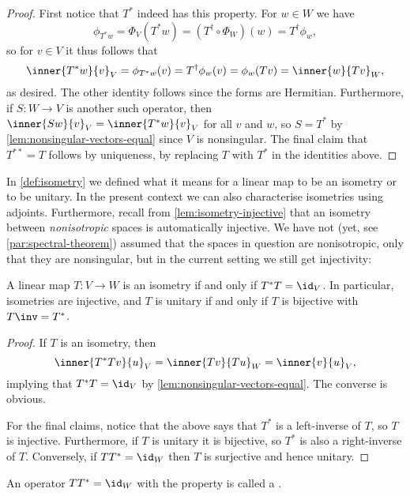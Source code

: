 \documentclass[a4paper, 11pt]{memoir}
\theoremstyle{plaincustomnumber}
\theoremstyle{changedotbreakcustomnumber}
\newcommand{\keyword}[1]{\ifbool{indefinition}{{\itshape #1}}{{\itshape\bfseries #1}}}
\begin{document}
\begin{proof}
    First notice that $T^*$ indeed has this property. For $w \in W$ we have
    \begin{equation*}
        \phi_{T^* w}
            = \Phi_V (T^* w)
            = (T^\dagger \circ \Phi_W)(w)
            = T^\dagger \phi_w,
    \end{equation*}
    so for $v \in V$ it thus follows that
    \begin{equation*}
        \inner{T^* w}{v}_V
            = \phi_{T^* w}(v)
            = T^\dagger \phi_w (v)
            = \phi_w(Tv)
            = \inner{w}{Tv}_W,
    \end{equation*}
    as desired. The other identity follows since the forms are Hermitian. Furthermore, if $S \colon W \to V$ is another such operator, then $\inner{Sw}{v}_V = \inner{T^*w}{v}_V$ for all $v$ and $w$, so $S = T^*$ by \cref{lem:nonsingular-vectors-equal} since $V$ is nonsingular. The final claim that $T^{**} = T$ follows by uniqueness, by replacing $T$ with $T^*$ in the identities above.
\end{proof}


\newpar

In \cref{def:isometry} we defined what it means for a linear map to be an isometry or to be unitary. In the present context we can also characterise isometries using adjoints. Furthermore, recall from \cref{lem:isometry-injective} that an isometry between \emph{nonisotropic} spaces is automatically injective. We have not (yet, see \cref{par:spectral-theorem}) assumed that the spaces in question are nonisotropic, only that they are nonsingular, but in the current setting we still get injectivity:

\begin{lemma}
    A linear map $T \colon V \to W$ is an isometry if and only if $T^*T = \id_V$. In particular, isometries are injective, and $T$ is unitary if and only if $T$ is bijective with $T\inv = T^*$.
\end{lemma}

\begin{proof}
    If $T$ is an isometry, then
    \begin{equation*}
        \inner{T^*Tv}{u}_V
            = \inner{Tv}{Tu}_W
            = \inner{v}{u}_V,
    \end{equation*}
    implying that $T^*T = \id_V$ by \cref{lem:nonsingular-vectors-equal}. The converse is obvious.

    For the final claims, notice that the above says that $T^*$ is a left-inverse of $T$, so $T$ is injective. Furthermore, if $T$ is unitary it is bijective, so $T^*$ is also a right-inverse of $T$. Conversely, if $TT^* = \id_W$ then $T$ is surjective and hence unitary.
\end{proof}
%
An operator $TT^* = \id_W$ with the property is called a \keyword{coisometry}.
\end{document}
